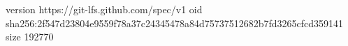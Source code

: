 version https://git-lfs.github.com/spec/v1
oid sha256:2f547d23804e9559f78a37c24345478a84d75737512682b7fd3265cfcd359141
size 192770
